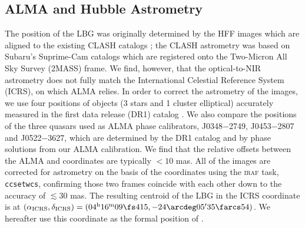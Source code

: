 \subsection{ALMA and Hubble Astrometry} \label{sec:astrometry}

    The position of the LBG was originally determined by the HFF \HST{} images which are aligned to the existing CLASH catalogs \citep{Postman12}; the CLASH astrometry was based on Subaru's Suprime-Cam catalogs which are registered onto the Two-Micron All Sky Survey (2MASS) frame.  We find, however, that the optical-to-NIR astrometry does not fully match the International Celestial Reference System (ICRS), on which ALMA relies.  In order to correct the astrometry of the \HST{} images, we use four positions of objects (3 stars and 1 cluster elliptical) accurately measured in the \Gaia{} first data release (DR1) catalog \citep{Gaia16a, Gaia16b}. We also compare the positions of the three quasars used as ALMA phase calibrators, J0348$-$2749, J0453$-$2807 and J0522$-$3627, which are determined by the \Gaia{} DR1 catalog and by phase solutions from our ALMA calibration.
    We find that the relative offsets between the ALMA and \Gaia{} coordinates are typically $< 10$ mas. All of the \HST{} images are corrected for astrometry on the basis of the \Gaia{} coordinates using the \textsc{iraf} \citep{Tody93} task, \texttt{ccsetwcs}, confirming those two frames coincide with each other down to the accuracy of $\lesssim 30$ mas. The resulting centroid of the LBG in the ICRS coordinate is at $\rm (\alpha_{ICRS}, \delta_{ICRS}) = (04^h 16^m 09\fs 415, -24\arcdeg 05' 35\farcs54)$. We hereafter use this coordinate as the formal position of \target{}.


